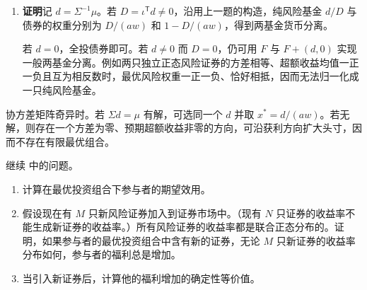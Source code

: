 \begin{solution}[blank-type=manual,blank-vsep=9\baselineskip]
\begin{enumerate}[label=(\alph*)]
    \item \textbf{证明}\quad 记 $d=\Sigma^{-1}\mu$。若 $D=\iota^{\mathsf T}d\ne0$，沿用上一题的构造，纯风险基金 $d/D$ 与债券的权重分别为 $D/(aw)$ 和 $1-D/(aw)$，得到两基金货币分离。

    若 $d=0$，全投债券即可。若 $d\ne0$ 而 $D=0$，仍可用 $F$ 与 $F+(d,0)$ 实现一般两基金分离。例如两只独立正态风险证券的方差相等、超额收益均值一正一负且互为相反数时，最优风险权重一正一负、恰好相抵，因而无法归一化成一只纯风险基金。
\end{enumerate}

协方差矩阵奇异时。若 $\Sigma d=\mu$ 有解，可选同一个 $d$ 并取 $x^*=d/(aw)$。若无解，则存在一个方差为零、预期超额收益非零的方向，可沿获利方向扩大头寸，因而不存在有限最优组合。
\end{solution}

\begin{problem}
 继续 中的问题。
\begin{enumerate}[label=(\alph*)]
    \item 计算在最优投资组合下参与者的期望效用。
    \item 假设现在有 $M$ 只新风险证券加入到证券市场中。（现有 $N$ 只证券的收益率不能生成新证券的收益率。）所有风险证券的收益率都是联合正态分布的。证明，如果参与者的最优投资组合中含有新的证券，无论 $M$ 只新证券的收益率分布如何，参与者的福利总是增加。
    \item 当引入新证券后，计算他的福利增加的确定性等价值。
\end{enumerate}
\end{problem}
